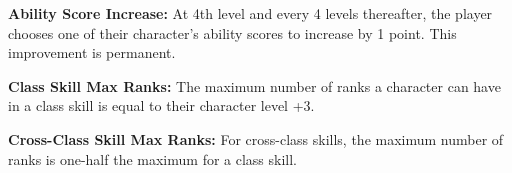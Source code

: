 \textbf{Ability Score Increase:} At 4th level and every 4 levels thereafter, the player chooses one of their character's ability scores to increase by 1 point. This improvement is permanent.

\textbf{Class Skill Max Ranks:} The maximum number of ranks a character can have in a class skill is equal to their character level +3.

\textbf{Cross-Class Skill Max Ranks:} For cross-class skills, the maximum number of ranks is one-half the maximum for a class skill.



